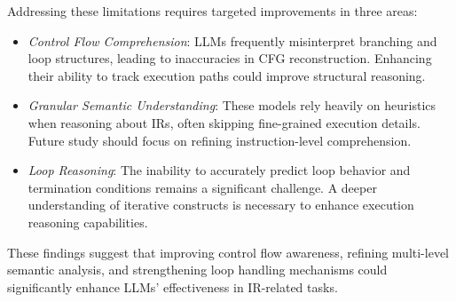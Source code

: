 Addressing these limitations requires targeted improvements in three areas:
\begin{itemize}[nolistsep,leftmargin=*]
    \item \emph{Control Flow Comprehension}: LLMs frequently misinterpret branching and loop structures, leading to inaccuracies in CFG reconstruction. Enhancing their ability to track execution paths could improve structural reasoning.
    \item \emph{Granular Semantic Understanding}: These models rely heavily on heuristics when reasoning about IRs, often skipping fine-grained execution details. Future study should focus on refining instruction-level comprehension.
    \item \emph{Loop Reasoning}: The inability to accurately predict loop behavior and termination conditions remains a significant challenge. A deeper understanding of iterative constructs is necessary to enhance execution reasoning capabilities.
\end{itemize}

These findings suggest that improving control flow awareness, refining multi-level semantic analysis, and strengthening loop handling mechanisms could significantly enhance LLMs' effectiveness in IR-related tasks.

